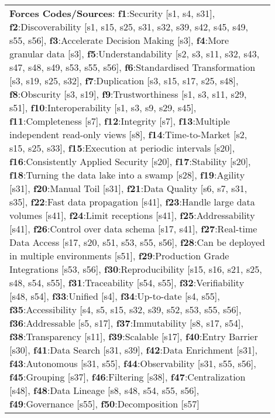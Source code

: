 \begin{tabular}{|p{0.12\linewidth}|p{0.015\linewidth}|p{0.3\linewidth}|p{0.15\linewidth}|p{0.31\linewidth}|}
\multicolumn{5}{l}{\parbox{\textwidth}{\smallskip
{\bf Forces Codes/Sources}: {\bf f1}:Security [s1, s4, s31], {\bf f2}:Discoverability [s1, s15, s25, s31, s32, s39, s42, s45, s49, s55, s56], {\bf f3}:Accelerate Decision Making [s3], {\bf f4}:More granular data [s3], {\bf f5}:Understandability [s2, s3, s11, s32, s43, s47, s48, s49, s53, s55, s56], {\bf f6}:Standardised Transformation [s3, s19, s25, s32], {\bf f7}:Duplication [s3, s15, s17, s25, s48], {\bf f8}:Obscurity [s3, s19], {\bf f9}:Trustworthiness [s1, s3, s11, s29, s51], {\bf f10}:Interoperability [s1, s3, s9, s29, s45], {\bf f11}:Completeness [s7], {\bf f12}:Integrity [s7], {\bf f13}:Multiple independent read-only views [s8], {\bf f14}:Time-to-Market [s2, s15, s25, s33], {\bf f15}:Execution at periodic intervals [s20], {\bf f16}:Consistently Applied Security [s20], {\bf f17}:Stability [s20], {\bf f18}:Turning the data lake into a swamp [s28], {\bf f19}:Agility [s31], {\bf f20}:Manual Toil [s31], {\bf f21}:Data Quality [s6, s7, s31, s35], {\bf f22}:Fast data propagation [s41], {\bf f23}:Handle large data volumes [s41], {\bf f24}:Limit receptions [s41], {\bf f25}:Addressability [s41], {\bf f26}:Control over data schema [s17, s41], {\bf f27}:Real-time Data Access [s17, s20, s51, s53, s55, s56], {\bf f28}:Can be deployed in multiple environments [s51], {\bf f29}:Production Grade Integrations [s53, s56], {\bf f30}:Reproducibility [s15, s16, s21, s25, s48, s54, s55], {\bf f31}:Traceability [s54, s55], {\bf f32}:Verifiability [s48, s54], {\bf f33}:Unified [s4], {\bf f34}:Up-to-date [s4, s55], {\bf f35}:Accessibility [s4, s5, s15, s32, s39, s52, s53, s55, s56], {\bf f36}:Addressable [s5, s17], {\bf f37}:Immutability [s8, s17, s54], {\bf f38}:Transparency [s11], {\bf f39}:Scalable [s17], {\bf f40}:Entry Barrier [s30], {\bf f41}:Data Search [s31, s39], {\bf f42}:Data Enrichment [s31], {\bf f43}:Autonomous [s31, s55], {\bf f44}:Observability [s31, s55, s56], {\bf f45}:Grouping [s37], {\bf f46}:Filtering [s38], {\bf f47}:Centralization [s48], {\bf f48}:Data Lineage [s8, s48, s54, s55, s56], {\bf f49}:Governance [s55], {\bf f50}:Decomposition [s57]}}
\end{tabular}

